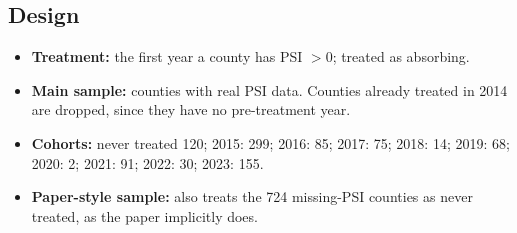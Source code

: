 \documentclass[11pt]{article}
\begin{document}
\subsection*{Design}
\begin{itemize}
\item \textbf{Treatment:} the first year a county has PSI $>0$; treated as absorbing.
\item \textbf{Main sample:} counties with real PSI data. Counties already treated in 2014 are dropped, since they have no pre-treatment year.
\item \textbf{Cohorts:} never treated 120; 2015: 299; 2016: 85; 2017: 75; 2018: 14; 2019: 68; 2020: 2; 2021: 91; 2022: 30; 2023: 155.
\item \textbf{Paper-style sample:} also treats the 724 missing-PSI counties as never treated, as the paper implicitly does.
\end{itemize}
\end{document}
